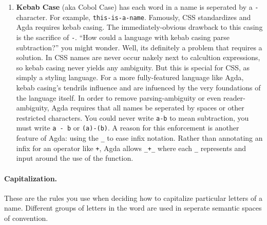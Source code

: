 \documentclass{article}
\newcommand{\code}[1]{\texttt{#1}}
\begin{document}
\begin{enumerate}[label=\Alph*)]
		\item \textbf{Kebab Case} (aka Cobol Case) has each word in a name is seperated by a \code{-} character. For example, \code{this-is-a-name}. Famously, CSS standardizes and Agda requires kebab casing. The immediately-obvious drawback to this casing is the sacrifice of \code{-}. ``How could a language with kebab casing parse subtraction?'' you might wonder. Well, its definitely a problem that requires a solution. In CSS names are never occur nakely next to calcultion expressions, so kebab casing never yields any ambiguity. But this is special for CSS, as simply a styling language. For a more fully-featured language like Agda, kebab casing's tendrils influence and are infuenced by the very foundations of the language itself. In order to remove parsing-ambiguity or even reader-ambiguity, Agda requires that all names be seperated by spaces or other restricted characters. You could never write \code{a-b} to mean subtraction, you must write \code{a - b} or \code{(a)-(b)}. A reason for this enforcement is another feature of Agda: using the \code{\_} to ease infix notation. Rather than annotating an infix for an operator like \code{+}, Agda allows \code{\_+\_} where each \code{\_} represents and input around the use of the function.
	\end{enumerate}

	\paragraph{Capitalization.} These are the rules you use when deciding how to capitalize particular letters of a name. Different groups of letters in the word are used in seperate semantic spaces of convention.
\end{document}
